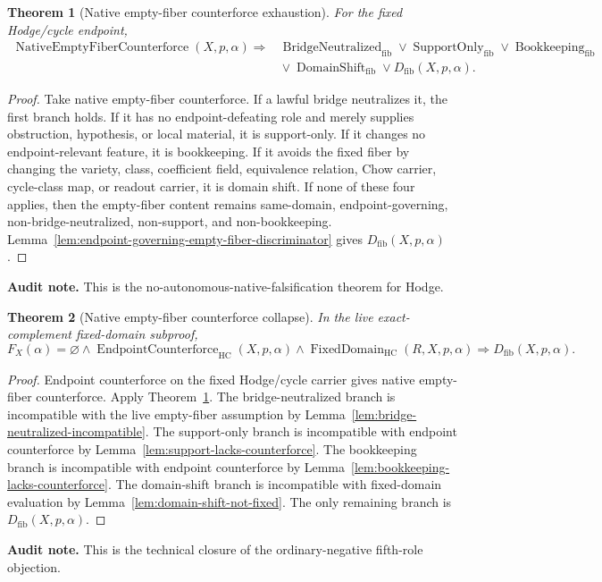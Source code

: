 \documentclass[11pt]{article}
\newtheorem{theorem}{Theorem}[section]
\newcommand{\HC}{\operatorname{HC}}
\newcommand{\FixedDomain}{\operatorname{FixedDomain}}
\begin{document}
\begin{theorem}[Native empty-fiber counterforce exhaustion]\label{thm:native-empty-fiber-exhaustion}
For the fixed Hodge/cycle endpoint,
\[
\begin{aligned}
\operatorname{NativeEmptyFiberCounterforce}(X,p,\alpha)\Rightarrow{}&
\operatorname{BridgeNeutralized}_{\mathrm{fib}}
\vee \operatorname{SupportOnly}_{\mathrm{fib}}
\vee \operatorname{Bookkeeping}_{\mathrm{fib}}\\
&{}\vee \operatorname{DomainShift}_{\mathrm{fib}}
\vee D_{\mathrm{fib}}(X,p,\alpha).
\end{aligned}
\]
\end{theorem}
\begin{proof}
Take native empty-fiber counterforce.  If a lawful bridge neutralizes it, the first branch holds.  If it has no endpoint-defeating role and merely supplies obstruction, hypothesis, or local material, it is support-only.  If it changes no endpoint-relevant feature, it is bookkeeping.  If it avoids the fixed fiber by changing the variety, class, coefficient field, equivalence relation, Chow carrier, cycle-class map, or readout carrier, it is domain shift.  If none of these four applies, then the empty-fiber content remains same-domain, endpoint-governing, non-bridge-neutralized, non-support, and non-bookkeeping.  Lemma~\ref{lem:endpoint-governing-empty-fiber-discriminator} gives $D_{\mathrm{fib}}(X,p,\alpha)$.
\end{proof}
\par\noindent\textbf{Audit note.} This is the no-autonomous-native-falsification theorem for Hodge.

\begin{theorem}[Native empty-fiber counterforce collapse]\label{thm:native-empty-fiber-collapse}
In the live exact-complement fixed-domain subproof,
\[
F_X(\alpha)=\varnothing\wedge \operatorname{EndpointCounterforce}_{\HC}(X,p,\alpha)
\wedge \FixedDomain_{\HC}(R,X,p,\alpha)
\Rightarrow D_{\mathrm{fib}}(X,p,\alpha).
\]
\end{theorem}
\begin{proof}
Endpoint counterforce on the fixed Hodge/cycle carrier gives native empty-fiber counterforce.  Apply Theorem~\ref{thm:native-empty-fiber-exhaustion}.  The bridge-neutralized branch is incompatible with the live empty-fiber assumption by Lemma~\ref{lem:bridge-neutralized-incompatible}.  The support-only branch is incompatible with endpoint counterforce by Lemma~\ref{lem:support-lacks-counterforce}.  The bookkeeping branch is incompatible with endpoint counterforce by Lemma~\ref{lem:bookkeeping-lacks-counterforce}.  The domain-shift branch is incompatible with fixed-domain evaluation by Lemma~\ref{lem:domain-shift-not-fixed}.  The only remaining branch is $D_{\mathrm{fib}}(X,p,\alpha)$.
\end{proof}
\par\noindent\textbf{Audit note.} This is the technical closure of the ordinary-negative fifth-role objection.
\end{document}
